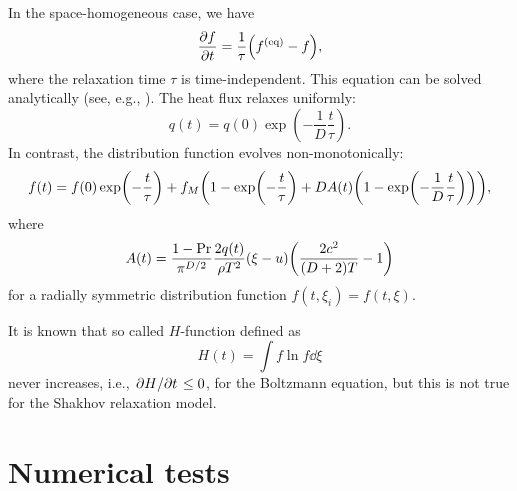 \documentclass{article}
\newcommand{\equil}[1]{#1^\mathrm{(eq)}}
\begin{document}
In the space-homogeneous case, we have
\begin{equation}\label{eq:relax}
    \pdv{f}{t} = \frac1\tau\qty(\equil{f} - f),
\end{equation}
where the relaxation time $\tau$ is time-independent.
This equation can be solved analytically (see, e.g., \cite{titarev2004numerical}).
The heat flux relaxes uniformly:
\begin{equation}\label{eq:relax:q}
    q(t) = q(0)\exp(-\frac1D\frac{t}\tau).
\end{equation}
In contrast, the distribution function evolves non-monotonically:
\begin{equation}\label{eq:relax:f}
    f(t) = f(0)\exp(-\frac{t}\tau) + f_M\qty(1 - \exp(-\frac{t}\tau) + DA(t)\qty(1-\exp(-\frac1D\frac{t}\tau))),
\end{equation}
where
\begin{equation}\label{eq:relax:A}
    A(t) = \frac{1-\Pr}{\pi^{D/2}}\frac{2q(t)}{\rho T^2}(\xi - u)\qty(\frac{2c^2}{(D+2)T} - 1)
\end{equation}
for a radially symmetric distribution function $f(t,\xi_i) = f(t,\xi)$.

It is known that so called $H$-function defined as
\begin{equation}\label{eq:relax:H}
    H(t) = \int f\ln{f}\dd\xi
\end{equation}
never increases, i.e., $\pdv*{H}{t}\leq0$, for the Boltzmann equation,
but this is not true for the Shakhov relaxation model.

\section{Numerical tests}
\end{document}
